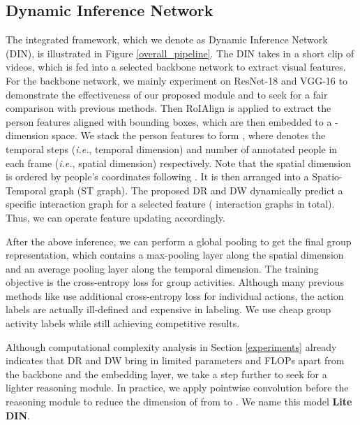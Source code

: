 \documentclass[10pt,twocolumn,letterpaper]{article}
\begin{document}
\subsection{Dynamic Inference Network}
The integrated framework, which we denote as Dynamic Inference Network (DIN), is illustrated in Figure \ref{overall_pipeline}. The DIN takes in a short clip of videos, which is fed into a selected backbone network to extract visual features. For the backbone network, we mainly experiment on ResNet-18 \cite{he2016resnet} and VGG-16 \cite{simonyan2014vgg} to demonstrate the effectiveness of our proposed module and to seek for a fair comparison with previous methods. Then RoIAlign \cite{he2017mask} is applied to extract the person features aligned with bounding boxes, which are then embedded to a -dimension space. We stack the person features to form , where  denotes the temporal steps (\textit{i.e.}, temporal dimension) and number of annotated people in each frame (\textit{i.e.}, spatial dimension) respectively. Note that the spatial dimension is ordered by people's coordinates following \cite{wu2019learning,gavrilyuk2020actor}. It is then arranged into a Spatio-Temporal graph (ST graph). The proposed DR and DW dynamically predict a specific interaction graph for a selected feature ( interaction graphs in total). Thus, we can operate feature updating accordingly.


After the above inference, we can perform a global pooling to get the final group representation, which contains a max-pooling layer along the spatial dimension and an average pooling layer along the temporal dimension. The training objective is the cross-entropy loss for group activities. Although many previous methods like \cite{qi2018stagnet,wu2019learning,azar2019crm,gavrilyuk2020actor} use additional cross-entropy loss for individual actions, the action labels are actually ill-defined \cite{weaklyGAR} and expensive in labeling. We use cheap group activity labels while still achieving competitive results. 

Although computational complexity analysis in Section \ref{experiments} already indicates that DR and DW bring in limited parameters and FLOPs apart from the backbone and the embedding layer, we take a step further to seek for a lighter reasoning module. In practice, we apply pointwise convolution \cite{howard2017mobilenetsv1} before the reasoning module to reduce the dimension of  from  to . We name this model \textbf{Lite DIN}.
\end{document}

